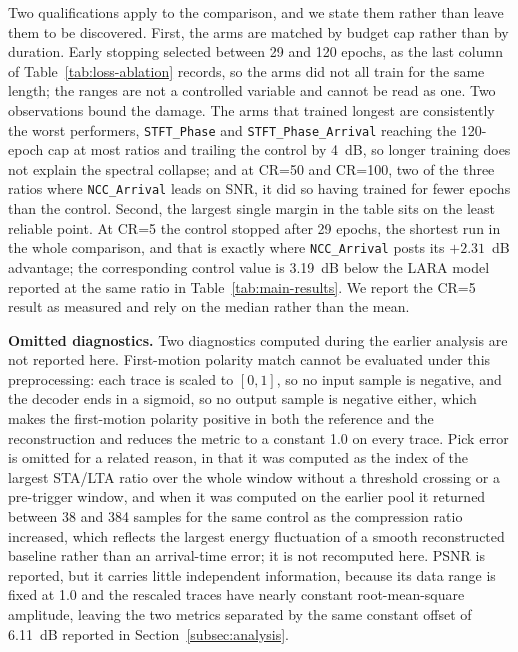 \documentclass[fleqn,10pt]{wlscirep}
\begin{document}
Two qualifications apply to the comparison, and we state them rather than leave them to be discovered. First, the arms are matched by budget cap rather than by duration. Early stopping selected between 29 and 120 epochs, as the last column of Table~\ref{tab:loss-ablation} records, so the arms did not all train for the same length; the ranges are not a controlled variable and cannot be read as one. Two observations bound the damage. The arms that trained longest are consistently the worst performers, \texttt{STFT\_Phase} and \texttt{STFT\_Phase\_Arrival} reaching the 120-epoch cap at most ratios and trailing the control by 4~dB, so longer training does not explain the spectral collapse; and at CR=50 and CR=100, two of the three ratios where \texttt{NCC\_Arrival} leads on SNR, it did so having trained for fewer epochs than the control. Second, the largest single margin in the table sits on the least reliable point. At CR=5 the control stopped after 29 epochs, the shortest run in the whole comparison, and that is exactly where \texttt{NCC\_Arrival} posts its $+2.31$~dB advantage; the corresponding control value is 3.19~dB below the LARA model reported at the same ratio in Table~\ref{tab:main-results}. We report the CR=5 result as measured and rely on the median rather than the mean.

\textbf{Omitted diagnostics.} Two diagnostics computed during the earlier analysis are not reported here. First-motion polarity match cannot be evaluated under this preprocessing: each trace is scaled to $[0,1]$, so no input sample is negative, and the decoder ends in a sigmoid, so no output sample is negative either, which makes the first-motion polarity positive in both the reference and the reconstruction and reduces the metric to a constant 1.0 on every trace. Pick error is omitted for a related reason, in that it was computed as the index of the largest STA/LTA ratio over the whole window without a threshold crossing or a pre-trigger window, and when it was computed on the earlier pool it returned between 38 and 384 samples for the same control as the compression ratio increased, which reflects the largest energy fluctuation of a smooth reconstructed baseline rather than an arrival-time error; it is not recomputed here. PSNR is reported, but it carries little independent information, because its data range is fixed at 1.0 and the rescaled traces have nearly constant root-mean-square amplitude, leaving the two metrics separated by the same constant offset of 6.11~dB reported in Section~\ref{subsec:analysis}.
\end{document}
